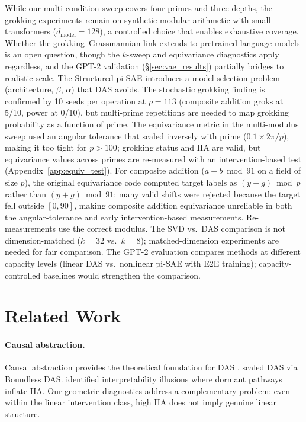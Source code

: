 \documentclass{article}
\begin{document}
While our multi-condition sweep covers four primes and three depths, the
grokking experiments remain on synthetic modular arithmetic with small
transformers ($d_\text{model} = 128$), a controlled choice that enables
exhaustive coverage. Whether the grokking--Grassmannian link extends to
pretrained language models is an open question, though the $k$-sweep and
equivariance diagnostics apply regardless, and the GPT-2 validation
(\S\ref{sec:vae_results}) partially bridges to realistic scale. The Structured
pi-SAE introduces a model-selection problem (architecture, $\beta$, $\alpha$)
that DAS avoids. The stochastic grokking finding is confirmed by 10 seeds per operation
at $p{=}113$ (composite addition groks at 5/10, power at 0/10), but
multi-prime repetitions are needed to map grokking probability as a function
of prime. The equivariance metric in the multi-modulus sweep used an angular
tolerance that scaled inversely with prime ($0.1 \times 2\pi/p$), making it
too tight for $p > 100$; grokking status and IIA are valid, but equivariance
values across primes are re-measured with an intervention-based test
(Appendix~\ref{app:equiv_test}).
For composite addition ($a + b \bmod 91$ on a field of size $p$), the
original equivariance code computed target labels as
$(y + g) \bmod p$ rather than $(y + g) \bmod 91$; many valid shifts were
rejected because the target fell outside $[0, 90]$, making composite
addition equivariance unreliable in both the angular-tolerance and early
intervention-based measurements. Re-measurements use the correct modulus. The SVD vs.\ DAS comparison is not
dimension-matched ($k = 32$ vs.\ $k = 8$); matched-dimension experiments
are needed for fair comparison. The GPT-2 evaluation compares methods at
different capacity levels (linear DAS vs.\ nonlinear pi-SAE with E2E
training); capacity-controlled baselines would strengthen the comparison.


\section{Related Work}
\label{sec:related}

\paragraph{Causal abstraction.}
Causal abstraction provides the theoretical foundation for DAS
\citep{geiger2021causal, geiger2023finding}. \citet{wu2024interpretability}
scaled DAS via Boundless DAS. \citet{makelov2024illusion} identified
interpretability illusions where dormant pathways inflate IIA. Our geometric
diagnostics address a complementary problem: even within the linear intervention
class, high IIA does not imply genuine linear structure.
\end{document}
